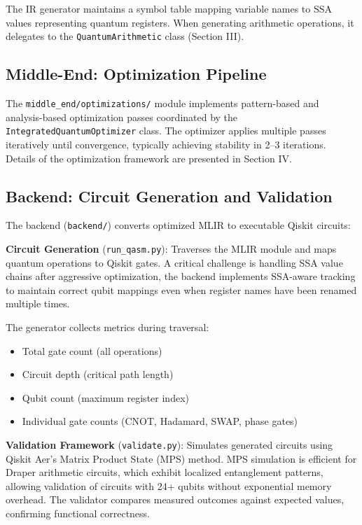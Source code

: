 \documentclass[a4paper,twocolumn]{article}
\begin{document}
The IR generator maintains a symbol table mapping variable names to SSA values representing quantum registers.
When generating arithmetic operations, it delegates to the \texttt{QuantumArithmetic} class (Section III).

\subsection{Middle-End: Optimization Pipeline}

The \texttt{middle\_end/optimizations/} module implements pattern-based and analysis-based optimization passes coordinated
by the \texttt{IntegratedQuantumOptimizer} class. The optimizer applies multiple passes iteratively until convergence,
typically achieving stability in 2--3 iterations. Details of the optimization framework are presented in Section IV.

\subsection{Backend: Circuit Generation and Validation}

The backend (\texttt{backend/}) converts optimized MLIR to executable Qiskit circuits:

\textbf{Circuit Generation} (\texttt{run\_qasm.py}): Traverses the MLIR module and maps quantum operations to Qiskit gates.
A critical challenge is handling SSA value chains after aggressive optimization, the backend implements SSA-aware tracking
to maintain correct qubit mappings even when register names have been renamed multiple times.

The generator collects metrics during traversal:
\begin{itemize}
  \item Total gate count (all operations)
  \item Circuit depth (critical path length)
  \item Qubit count (maximum register index)
  \item Individual gate counts (CNOT, Hadamard, SWAP, phase gates)
\end{itemize}

\textbf{Validation Framework} (\texttt{validate.py}): Simulates generated circuits using Qiskit Aer's Matrix Product State
(MPS) method. MPS simulation is efficient for Draper arithmetic circuits, which exhibit localized entanglement patterns,
allowing validation of circuits with 24+ qubits without exponential memory overhead. The validator compares measured outcomes
against expected values, confirming functional correctness.
\end{document}
